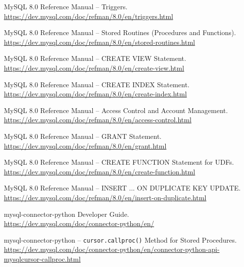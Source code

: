 \documentclass[12pt, a4paper]{article}
\begin{document}
\begin{enumerate}[leftmargin=2em, label={[\arabic*]}]

  \item MySQL 8.0 Reference Manual -- Triggers.\\
        \url{https://dev.mysql.com/doc/refman/8.0/en/triggers.html}

  \item MySQL 8.0 Reference Manual -- Stored Routines (Procedures and Functions).\\
        \url{https://dev.mysql.com/doc/refman/8.0/en/stored-routines.html}

  \item MySQL 8.0 Reference Manual -- CREATE VIEW Statement.\\
        \url{https://dev.mysql.com/doc/refman/8.0/en/create-view.html}

  \item MySQL 8.0 Reference Manual -- CREATE INDEX Statement.\\
        \url{https://dev.mysql.com/doc/refman/8.0/en/create-index.html}

  \item MySQL 8.0 Reference Manual -- Access Control and Account Management.\\
        \url{https://dev.mysql.com/doc/refman/8.0/en/access-control.html}

  \item MySQL 8.0 Reference Manual -- GRANT Statement.\\
        \url{https://dev.mysql.com/doc/refman/8.0/en/grant.html}

  \item MySQL 8.0 Reference Manual -- CREATE FUNCTION Statement for UDFs.\\
        \url{https://dev.mysql.com/doc/refman/8.0/en/create-function.html}

  \item MySQL 8.0 Reference Manual -- INSERT ... ON DUPLICATE KEY UPDATE.\\
        \url{https://dev.mysql.com/doc/refman/8.0/en/insert-on-duplicate.html}

  \item mysql-connector-python Developer Guide.\\
        \url{https://dev.mysql.com/doc/connector-python/en/}

  \item mysql-connector-python -- \texttt{cursor.callproc()} Method for Stored Procedures.\\
        \url{https://dev.mysql.com/doc/connector-python/en/connector-python-api-mysqlcursor-callproc.html}


\end{enumerate}
\end{document}
